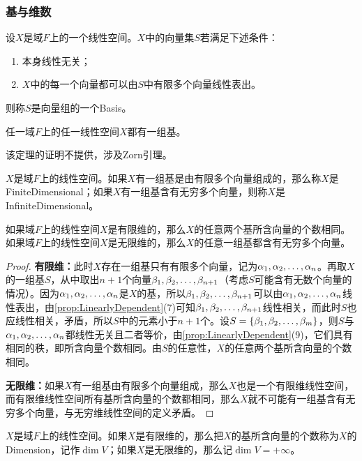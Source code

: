 \subsubsection{基与维数}
\begin{definition}
	设$X$是域$F$上的一个线性空间。$X$中的向量集$S$若满足下述条件：
	\begin{enumerate}
		\item 本身线性无关；
		\item $X$中的每一个向量都可以由$S$中有限多个向量线性表出。
	\end{enumerate}
	则称$S$是向量组的一个\gls{Basis}。
\end{definition}
\begin{theorem}\label{theo:ExistenceOfBasis}
	任一域$F$上的任一线性空间$X$都有一组基。
\end{theorem}
该定理的证明不提供，涉及Zorn引理。
\begin{definition}
	$X$是域$F$上的线性空间。如果$X$有一组基是由有限多个向量组成的，那么称$X$是\gls{FiniteDimensional}；如果$X$有一组基含有无穷多个向量，则称$X$是\gls{InfiniteDimensional}。
\end{definition}
\begin{theorem}\label{theo:NOfBasisVector}
	如果域$F$上的线性空间$X$是有限维的，那么$X$的任意两个基所含向量的个数相同。如果域$F$上的线性空间$X$是无限维的，那么$X$的任意一组基都含有无穷多个向量。
\end{theorem}
\begin{proof}
	\textbf{有限维：}此时$X$存在一组基只有有限多个向量，记为$\alpha_1, \alpha_2, \dots, \alpha_{n}$。再取$X$的一组基$S$，从中取出$n+1$个向量$\beta_1, \beta_2, \dots, \beta_{n+1}$（考虑$S$可能含有无数个向量的情况）。因为$\alpha_1, \alpha_2, \dots, \alpha_{n}$是$X$的基，所以$\beta_1, \beta_2, \dots, \beta_{n+1}$可以由$\alpha_1, \alpha_2, \dots, \alpha_{n}$线性表出，由\cref{prop:LinearlyDependent}(7)可知$\beta_1, \beta_2, \dots, \beta_{n+1}$线性相关，而此时$S$也应线性相关，矛盾，所以$S$中的元素小于$n+1$个。设$S=\{\beta_1, \beta_2, \dots, \beta_{m}\}$，则$S$与$\alpha_1, \alpha_2, \dots, \alpha_{n}$都线性无关且二者等价，由\cref{prop:LinearlyDependent}(9)，它们具有相同的秩，即所含向量个数相同。由$S$的任意性，$X$的任意两个基所含向量的个数相同。\par
	\textbf{无限维：}如果$X$有一组基由有限多个向量组成，那么$X$也是一个有限维线性空间，而有限维线性空间所有基所含向量的个数都相同，那么$X$就不可能有一组基含有无穷多个向量，与无穷维线性空间的定义矛盾。
\end{proof}
\begin{definition}
	$X$是域$F$上的线性空间。如果$X$是有限维的，那么把$X$的基所含向量的个数称为$X$的\gls{Dimension}，记作$\operatorname{dim}V$；如果$X$是无限维的，那么记$\dim V=+\infty$。
\end{definition}
